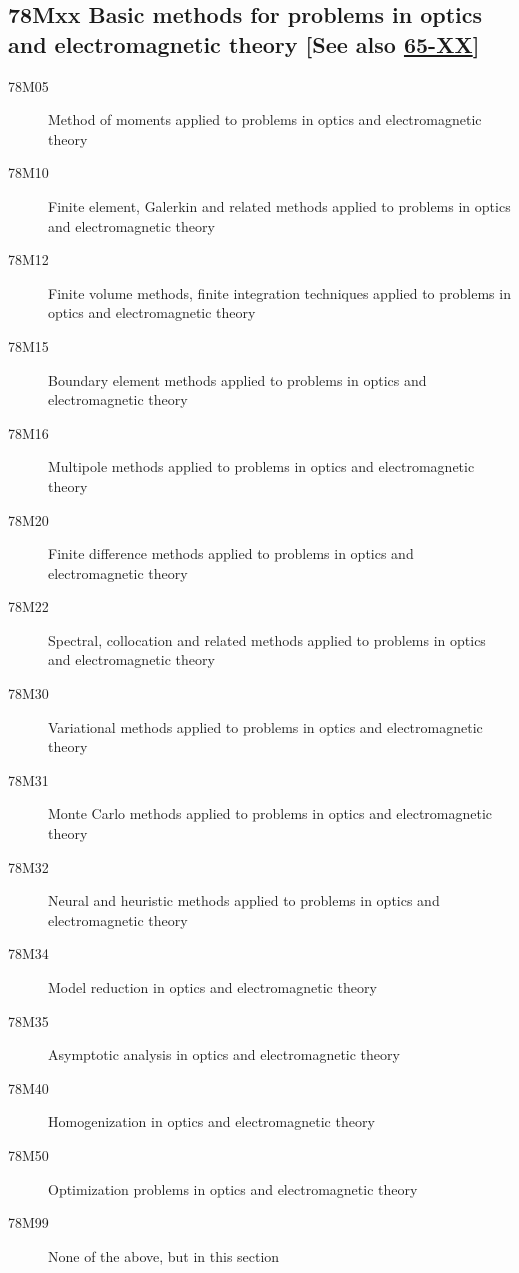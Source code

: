 \documentclass[letterpaper]{article}
\begin{document}
\subsection*{78Mxx  Basic methods for problems in optics and electromagnetic theory [See also \hyperref[65-XX]{65-XX}] }\label{78Mxx}
\begin{description}  
\item [78M05]\label{78M05} Method of moments applied to problems in optics and electromagnetic theory
\item [78M10]\label{78M10} Finite element, Galerkin and related methods applied to problems in optics and electromagnetic theory
\item [78M12]\label{78M12} Finite volume methods, finite integration techniques applied to problems in optics and electromagnetic theory
\item [78M15]\label{78M15} Boundary element methods applied to problems in optics and electromagnetic theory
\item [78M16]\label{78M16} Multipole methods applied to problems in optics and electromagnetic theory
\item [78M20]\label{78M20} Finite difference methods applied to problems in optics and electromagnetic theory
\item [78M22]\label{78M22} Spectral, collocation and related methods applied to problems in optics and electromagnetic theory
\item [78M30]\label{78M30} Variational methods applied to problems in optics and electromagnetic theory
\item [78M31]\label{78M31} Monte Carlo methods applied to problems in optics and electromagnetic theory
\item [78M32]\label{78M32} Neural and heuristic methods applied to problems in optics and electromagnetic theory
\item [78M34]\label{78M34} Model reduction in optics and electromagnetic theory
\item [78M35]\label{78M35} Asymptotic analysis in optics and electromagnetic theory
\item [78M40]\label{78M40} Homogenization in optics and electromagnetic theory
\item [78M50]\label{78M50} Optimization problems in optics and electromagnetic theory
\item [78M99]\label{78M99} None of the above, but in this section
\end{description}
\end{document}
